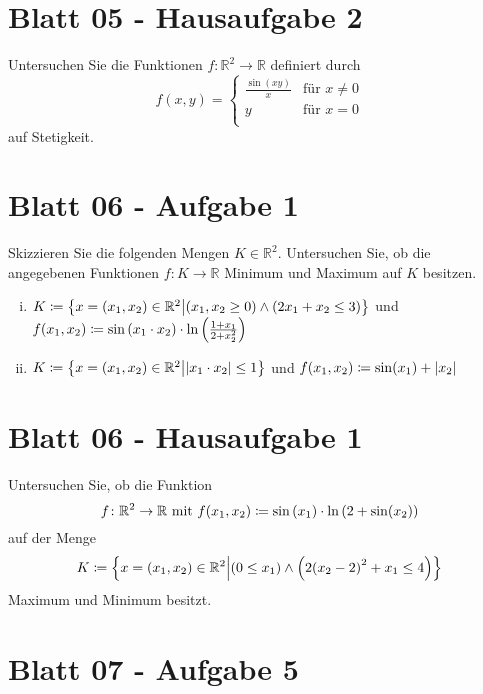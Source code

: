 \documentclass{scrreprt}
\begin{document}
\section{Blatt 05 - Hausaufgabe 2}

Untersuchen Sie die Funktionen $f \colon \mathbb{R}^2 \to \mathbb{R}$ definiert
durch
\[
  f(x, y) = \begin{cases}
    \frac{\sin(xy)}{x} & \text{für } x \ne 0 \\
    y & \text{für } x = 0 \\
  \end{cases}
\]
auf Stetigkeit.

\section{Blatt 06 - Aufgabe 1}

Skizzieren Sie die folgenden Mengen $K \in \mathbb{R}^2$.
Untersuchen Sie, ob die angegebenen Funktionen $f: K \to \mathbb{R}$
Minimum und Maximum auf $K$ besitzen.
\begin{enumerate}[(i)]
\item $K \coloneqq \qty{x = \qty(x_1, x_2) \in \mathbb{R}^2 \middle|
    (x_1, x_2 \geq 0) \land (2x_1 + x_2 \leq 3)}$ und
  $f\qty(x_1, x_2) \coloneqq \sin\qty(x_1 \cdot x_2) \cdot
  \ln\qty(\frac{1 + x_1}{2 + x_2^2})$

\item $K \coloneqq \qty{x = \qty(x_1, x_2) \in \mathbb{R}^2 \middle|
    \abs{x_1 \cdot x_2} \leq 1}$ und
  $f\qty(x_1, x_2) \coloneqq \sin(x_1) + \abs{x_2}$
\end{enumerate}

\section{Blatt 06 - Hausaufgabe 1}

Untersuchen Sie, ob die Funktion
\[
  f \colon \mathbb{R}^2 \to \mathbb{R} \text{ mit }
  f\qty(x_1, x_2) \coloneqq \sin\qty(x_1) \cdot \ln\qty(2 + \sin(x_2))
\]
auf der Menge
\[
  K \coloneqq \qty{x = \qty(x_1, x_2) \in \mathbb{R}^2 \middle| \qty(0 \leq x_1) \land \qty(2\qty(x_2 - 2)^2 + x_1 \leq 4)}
\]
Maximum und Minimum besitzt.

\section{Blatt 07 - Aufgabe 5}
\end{document}
